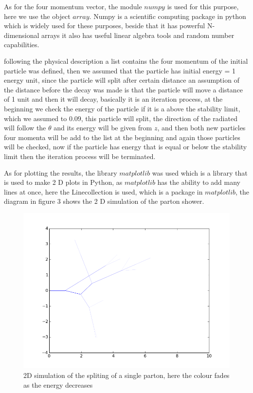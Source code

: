 As for the four momentum vector, the module $numpy$ is used for this purpose, here we use the object $array$. Numpy is a scientific computing package in python which is widely used for these purposes, beside that it has powerful N-dimensional arrays it also has useful linear algebra tools and random number capabilities.         

following the physical description a list contains the four momentum of the initial particle was defined, then we assumed that the particle has initial energy = 1 energy unit, since the particle will split after certain distance an assumption of the distance before the decay was made is that the particle will move a distance of 1 unit and then it will decay, basically it is an iteration process,  at the beginning we check the energy of the particle if it is a above the stability limit, which we assumed to $0.09$, this particle will split, the direction of the radiated will follow the $\theta$ and its energy will be given from $z$, and then both new particles four momenta will be add to the list at the beginning and again those particles will be checked, now if the particle has energy that is equal or below the stability limit then the iteration process will be terminated.   

As for plotting the results, the library $matplotlib$ was used which is a library that is used to make 2 D plots in Python, as $matplotlib$ has the ability to add many lines at once, here the Linecollection is used, which is a package in $matplotlib$, the diagram in figure 3 shows the 2 D simulation of the parton shower.  \begin{figure}[H]
\centering
\includegraphics[scale=.5]{images/2D_partonshower.png}
\caption{2D simulation of the spliting of a single parton, here the colour fades as the energy decreases}
\end{figure}


